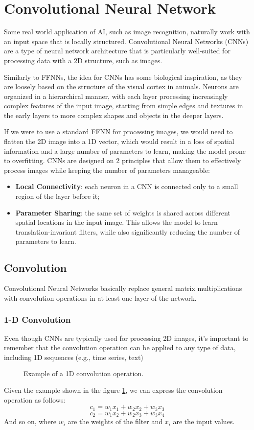 \section{Convolutional Neural Network}
Some real world application of AI, such as image recognition, naturally work with an input space that is locally structured.
Convolutional Neural Networks (CNNs) are a type of neural network architecture that is particularly well-suited for processing data with a 2D structure, 
such as images.

Similarly to FFNNs, the idea for CNNs has some biological inspiration, as they are loosely based on the structure of the visual cortex in animals.
Neurons are organized in a hierarchical manner, with each layer processing increasingly complex features of the input image, starting from simple edges and 
textures in the early layers to more complex shapes and objects in the deeper layers.

If we were to use a standard FFNN for processing images, we would need to flatten the 2D image into a 1D vector, which would result in a loss
of spatial information and a large number of parameters to learn, making the model prone to overfitting.
CNNs are designed on 2 principles that allow them to effectively process images while keeping the number of parameters manageable:
\begin{itemize}
    \item \textbf{Local Connectivity}: each neuron in a CNN is connected only to a small region of the layer before it;
    \item \textbf{Parameter Sharing}: the same set of weights is shared across different spatial locations in the input image.
    This allows the model to learn translation-invariant filters, while also significantly reducing the number of parameters to learn.
\end{itemize}

\subsection{Convolution}
Convolutional Neural Networks basically replace general matrix multiplications with convolution operations in at least one layer of the network.

\subsubsection*{1-D Convolution}
Even though CNNs are typically used for processing 2D images, it's important to remember that the convolution operation can be applied to any type of data, including 1D sequences (e.g., time series, text)
\begin{figure}[H]
    \centering
    
    \caption{Example of a 1D convolution operation.}
    \label{fig:1D-convolution}
\end{figure}
Given the example shown in the figure \ref{fig:1D-convolution}, we can express the convolution operation as follows:
$$ c_1 = w_1 x_1 + w_2 x_2 + w_3 x_3 $$
$$ c_2 = w_1 x_2 + w_2 x_3 + w_3 x_4 $$
And so on, where $w_i$ are the weights of the filter and $x_i$ are the input values.

